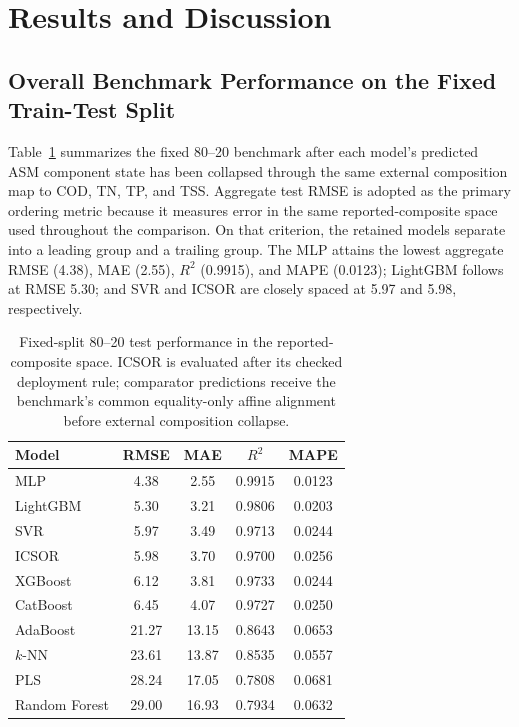 \documentclass[a4paper,fleqn]{cas-sc}
\newcommand{\rev}[1]{#1}
\newenvironment{revblock}{}{}
\begin{document}
\section{\rev{Results and Discussion}}
\begin{revblock}

\subsection{Overall Benchmark Performance on the Fixed Train-Test Split}

Table~\ref{tab:results_benchmark_sample} summarizes the fixed 80--20 benchmark after each model's predicted ASM component state has been collapsed through the same external composition map to COD, TN, TP, and TSS. Aggregate test RMSE is adopted as the primary ordering metric because it measures error in the same reported-composite space used throughout the comparison. On that criterion, the retained models separate into a leading group and a trailing group. The MLP attains the lowest aggregate RMSE (4.38), MAE (2.55), $R^2$ (0.9915), and MAPE (0.0123); LightGBM follows at RMSE 5.30; and SVR and ICSOR are closely spaced at 5.97 and 5.98, respectively.

\begin{table}[H]
\centering
\caption{Fixed-split 80--20 test performance in the reported-composite space. ICSOR is evaluated after its checked deployment rule; comparator predictions receive the benchmark's common equality-only affine alignment before external composition collapse.}
\label{tab:results_benchmark_sample}
\scriptsize
\begin{tabular}{lcccc}
\hline
Model & RMSE & MAE & $R^2$ & MAPE \\
\hline
MLP & 4.38 & 2.55 & 0.9915 & 0.0123 \\
LightGBM & 5.30 & 3.21 & 0.9806 & 0.0203 \\
SVR & 5.97 & 3.49 & 0.9713 & 0.0244 \\
ICSOR & 5.98 & 3.70 & 0.9700 & 0.0256 \\
XGBoost & 6.12 & 3.81 & 0.9733 & 0.0244 \\
CatBoost & 6.45 & 4.07 & 0.9727 & 0.0250 \\
AdaBoost & 21.27 & 13.15 & 0.8643 & 0.0653 \\
$k$-NN & 23.61 & 13.87 & 0.8535 & 0.0557 \\
PLS & 28.24 & 17.05 & 0.7808 & 0.0681 \\
Random Forest & 29.00 & 16.93 & 0.7934 & 0.0632 \\
\hline
\end{tabular}
\end{table}


\end{revblock}
\end{document}
